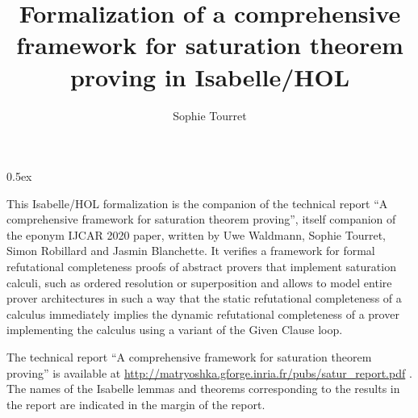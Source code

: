 \documentclass[11pt,a4paper]{book}
\begin{document}
\title{Formalization of a comprehensive framework for saturation theorem proving in Isabelle/HOL}
\author{Sophie Tourret}
\maketitle
\tableofcontents

\parindent 0pt\parskip 0.5ex

This Isabelle/HOL formalization is the companion of the technical report ``A comprehensive framework for saturation theorem proving'', itself companion of the eponym IJCAR 2020 paper, written by Uwe Waldmann, Sophie Tourret, Simon Robillard and Jasmin Blanchette.
It verifies a framework for formal refutational completeness proofs of abstract provers that implement saturation calculi, such as ordered resolution or superposition and allows to model entire prover architectures in such a way that the static refutational completeness of a calculus immediately implies the dynamic refutational completeness of a prover implementing the calculus using a variant of the Given Clause loop.

The technical report ``A comprehensive framework for saturation theorem proving'' is available at \url{http://matryoshka.gforge.inria.fr/pubs/satur\_report.pdf} .
The names of the Isabelle lemmas and theorems corresponding to the results in the report are indicated in the margin of the report.



%
%
\end{document}
